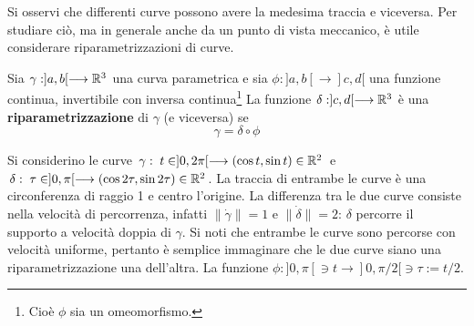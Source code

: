 Si osservi che differenti curve possono avere la medesima traccia e viceversa. 
Per studiare ciò, ma in generale anche da un punto di vista meccanico, è 
utile considerare riparametrizzazioni di curve. 
\begin{definizione}
  Sia $\gamma:]a,b[\longrightarrow \mathbb{R}^{3}$ una curva parametrica e sia 
  $\phi:]a,b[ \longrightarrow]c,d[$ una funzione continua, invertibile con 
  inversa continua\footnote{Cioè $\phi$ sia un omeomorfismo.} La funzione
  $\delta: ]c,d[\longrightarrow\mathbb{R}^{3}$ è una \textbf{riparametrizzazione} di 
$\gamma$
  (e viceversa) se 
  \[
    \gamma = \delta\circ\phi
  \]     
\end{definizione}
\begin{figure}[h!]
\begin{center}
{\small
\begin{inaccessibleblock}[TODO.]
{}
\end{inaccessibleblock}
}
\end{center}
\end{figure}
  
\begin{esempio}
  Si considerino le curve $\gamma: \;t\in]0,2\pi[\longrightarrow (\cos t,\sin 
t)\in\mathbb{R}^{2}$ 
  e $\delta:\;\tau\in ]0,\pi[\longrightarrow (\cos2\tau,\sin2\tau)\in\mathbb{R}^{2}$. 
La traccia di entrambe le curve è una circonferenza di raggio 1 e centro 
l'origine. 
La differenza tra le due curve consiste nella velocità di percorrenza, infatti 
$\|\dot\gamma\|=1$ e $\|\dot \delta\|=2$: $\delta$ percorre il supporto a 
velocità doppia di $\gamma$.
  Si noti che entrambe le curve sono percorse con velocità uniforme, pertanto 
è semplice immaginare che le due curve siano una riparametrizzazione una 
dell'altra.
  La funzione $\phi:]0,\pi[\ni t \longrightarrow ]0,\pi/2[\ni \tau:=t/2$.
\end{esempio}

